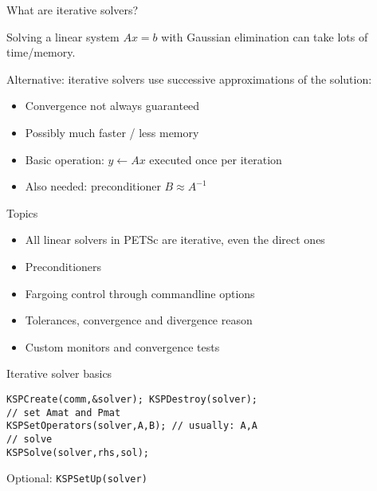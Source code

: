 

\begin{numberedframe}{What are iterative solvers?}

Solving a linear system $Ax=b$ with Gaussian elimination can take lots
of time/memory.

Alternative: iterative solvers use successive approximations of the
solution:
\begin{itemize}
\item Convergence not always guaranteed
\item Possibly much faster / less memory
\item Basic operation: $y\leftarrow Ax$ executed once per iteration
\item Also needed: preconditioner $B\approx A^{-1}$
\end{itemize}
\end{numberedframe}

\begin{numberedframe}{Topics}
  \begin{itemize}
  \item All linear solvers in PETSc are iterative, even the direct ones
  \item Preconditioners
  \item Fargoing control through commandline options
  \item Tolerances, convergence and divergence reason
  \item Custom monitors and convergence tests
  \end{itemize}
\end{numberedframe}


\begin{numberedframe}{Iterative solver basics}
\begin{lstlisting}
KSPCreate(comm,&solver); KSPDestroy(solver);
// set Amat and Pmat
KSPSetOperators(solver,A,B); // usually: A,A
// solve
KSPSolve(solver,rhs,sol);
\end{lstlisting}
Optional: \lstinline{KSPSetUp(solver)}

\end{numberedframe}

